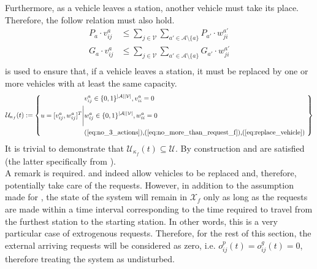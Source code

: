  Furthermore, as a vehicle leaves a station, another vehicle must take its place. Therefore, the follow relation must also hold. 
 \begin{equation}
 	\begin{aligned}
 		P_a\cdot v^a_{ij} &\leq \sum_{j \in\mathcal{V}} \sum_{a'\in \mathcal{A} \setminus \{a\}}P_{a'}\cdot	w^{a'}_{ji}\\
 		G_a\cdot v^a_{ij} &\leq \sum_{j \in\mathcal{V}} \sum_{a'\in \mathcal{A} \setminus \{a\}}G_{a'}\cdot w^{a'}_{ji}\\
 	\end{aligned}
 	\label{eq:replace_vehicle}
 \end{equation}
 is used to ensure that, if a vehicle leaves a station, it must be replaced by one or more vehicles with at least the same capacity.
\begin{equation}
	\mathcal{\mathcal{U}}_{\kappa_f}(t) := \left\{
	\begin{aligned}
		&v^a_{ij} \in \{0,1\}^{|\mathcal{A}||\mathcal{V}|}, v^a_{ii} = 0 \\
		u = [v^{a}_{ij}, w^{a}_{ij}]^T \Bigg|&w^a_{ij} \in \{0,1\}^{|\mathcal{A}||\mathcal{V}|},w^a_{ii} = 0 \\ 
		&\text{(\ref{eq:no_3_actions}),(\ref{eq:no_more_than_request_f}),(\ref{eq:replace_vehicle})
		} \\
	\end{aligned}
	\right\}
\end{equation}
It is trivial to demonstrate that $\mathcal{\mathcal{U}}_{\kappa_f}(t) \subseteq \mathcal{U}$. By construction  and  are satisfied (the latter specifically from ). \\
A remark is required.  and  indeed allow vehicles to be replaced and, therefore, potentially take care of the requests. However, in addition to the assumption made for , the state of the system will remain in $\mathcal{X}_f$ only as long as the requests are made within a time interval corresponding to the time required to travel  from the furthest station to the starting station. In other words, this is a very particular case of extrogenous requests. Therefore, for the rest of this section, the external arriving requests will be considered as zero, i.e. $o^p_{ij}(t) =  o^g_{ij}(t) = 0$, therefore treating the system as undisturbed.\\
